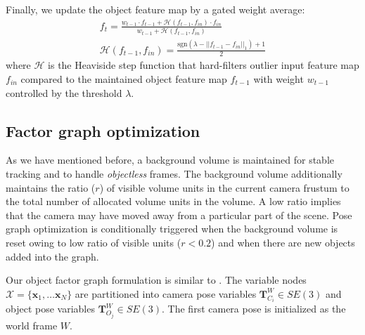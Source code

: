 Finally, we update the object feature map by a gated weight average:
\begin{align}
    f_t = \frac{w_{t-1} \cdot f_{t-1} + \mathcal{H}(f_{t-1}, f_{in}) \cdot f_{in}}{w_{t-1} + \mathcal{H}(f_{t-1}, f_{in})}\\
    \mathcal{H}(f_{t-1}, f_{in}) = \frac{\textrm{sgn}(\lambda - ||f_{t-1} - f_{in}||_1) + 1}{2}
\end{align}
where $\mathcal{H}$ is the Heaviside step function that hard-filters outlier input feature map $f_{in}$ compared to the maintained object feature map $f_{t-1}$ with weight $w_{t-1}$ controlled by the threshold $\lambda$.


\subsection{Factor graph optimization} \label{subsec: optimization}

As we have mentioned before, a background volume is maintained for stable tracking and to handle \textit{objectless} frames. The background volume additionally maintains the ratio ($r$) of visible volume units in the current camera frustum to the total number of allocated volume units in the volume. A low ratio implies that the camera may have moved away from a particular part of the scene. Pose graph optimization is conditionally triggered when the background volume is reset owing to low ratio of visible units ($r < 0.2$) and when there are new objects added into the graph.

Our object factor graph formulation is similar to \cite{salas-morenoSLAMSimultaneousLocalisation2013, mccormacFusionVolumetricObjectLevel2018}. The variable nodes $\mathcal{X} = \{\mathbf{x}_1, \dots \mathbf{x}_N\}$ are partitioned into camera pose variables $\mathbf{T}^{W}_{C_i} \in SE(3)$ and object pose variables $\mathbf{T}^W_{O_j} \in SE(3)$. The first camera pose is initialized as the world frame $W$.

